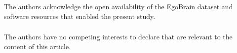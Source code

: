 \documentclass[runningheads]{llncs}
\begin{document}
\begin{credits}
\subsubsection{\ackname}
The authors acknowledge the open availability of the EgoBrain dataset and software resources that enabled the present study.

\subsubsection{\discintname}
The authors have no competing interests to declare that are relevant to the content of this article.
\end{credits}
\end{document}
